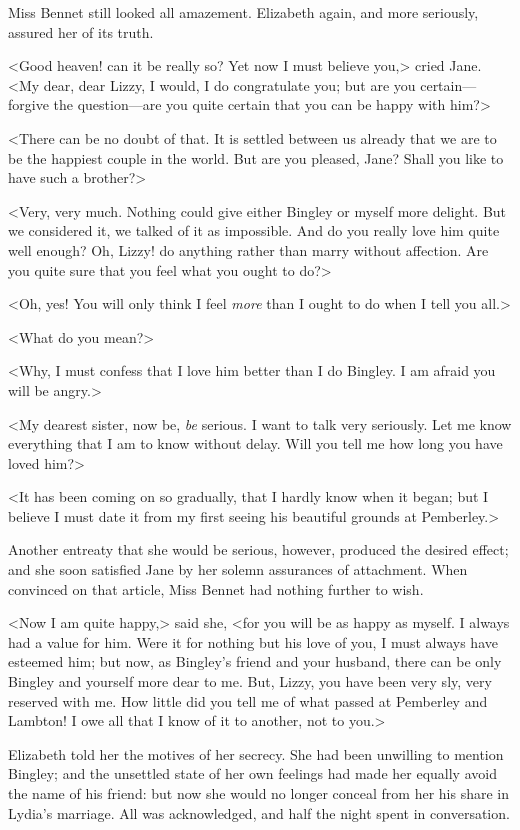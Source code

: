 Miss Bennet still looked all amazement. Elizabeth again, and more seriously, assured her of its truth.

<Good heaven! can it be really so? Yet now I must believe you,> cried Jane. <My dear, dear Lizzy, I would, I do congratulate you; but are you certain—forgive the question—are you quite certain that you can be happy with him?>

<There can be no doubt of that. It is settled between us already that we are to be the happiest couple in the world. But are you pleased, Jane? Shall you like to have such a brother?>

<Very, very much. Nothing could give either Bingley or myself more delight. But we considered it, we talked of it as impossible. And do you really love him quite well enough? Oh, Lizzy! do anything rather than marry without affection. Are you quite sure that you feel what you ought to do?>

<Oh, yes! You will only think I feel \textit{more} than I ought to do when I tell you all.>

<What do you mean?>

<Why, I must confess that I love him better than I do Bingley. I am afraid you will be angry.>

<My dearest sister, now be, \textit{be} serious. I want to talk very seriously. Let me know everything that I am to know without delay. Will you tell me how long you have loved him?>

<It has been coming on so gradually, that I hardly know when it began; but I believe I must date it from my first seeing his beautiful grounds at Pemberley.>

Another entreaty that she would be serious, however, produced the desired effect; and she soon satisfied Jane by her solemn assurances of attachment. When convinced on that article, Miss Bennet had nothing further to wish.

<Now I am quite happy,> said she, <for you will be as happy as myself. I always had a value for him. Were it for nothing but his love of you, I must always have esteemed him; but now, as Bingley's friend and your husband, there can be only Bingley and yourself more dear to me. But, Lizzy, you have been very sly, very reserved with me. How little did you tell me of what passed at Pemberley and Lambton! I owe all that I know of it to another, not to you.>

Elizabeth told her the motives of her secrecy. She had been unwilling to mention Bingley; and the unsettled state of her own feelings had made her equally avoid the name of his friend: but now she would no longer conceal from her his share in Lydia's marriage. All was acknowledged, and half the night spent in conversation.

